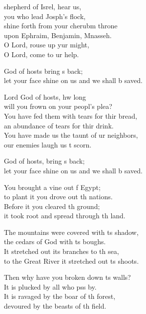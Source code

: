 \settowidth{\versewidth}{let your face shine on us and we shall be saved.}
\begin{psalmverse}%
  \begin{patverse}
 shepherd of Isrel, hear us,\Med\\
you who lead Josph’s flock,\\
shine forth from your cherub\pointup{\i}m throne\Med\\
upon Ephraim, Benjamin, Mnasseh.\\
O Lord, rouse up yur might,\Med\\
O Lord, come to ur help.

God of hosts bring s back;\Med\\
let your face shine on us and we shall b saved.

Lord God of hosts, hw long\Med\\
will you frown on your peopl’s plea?\\
You have fed them with tears for thir bread,\Med\\
an abundance of tears for thir drink.\\
You have made us the taunt of ur neighbors,\Med\\
our enemies laugh us t scorn.

God of hosts, bring s back;\Med\\
let your face shine on us and we shall b saved.

You brought a vine out f Egypt;\Med\\
to plant it you drove out th nations.\\
Before it you cleared th ground;\Med\\
it took root and spread through th land.

The mountains were covered with \pointup{\i}ts shadow,\Med\\
the cedars of God with \pointup{\i}ts boughs.\\
It stretched out its branches to th sea,\Med\\
to the Great River it stretched out \pointup{\i}ts shoots.

Then why have you broken down \pointup{\i}ts walls?\Med\\
It is plucked by all who pss by.\\
It is ravaged by the boar of th forest,\Med\\
devoured by the beasts of th field.


\end{patverse}
\end{psalmverse}

